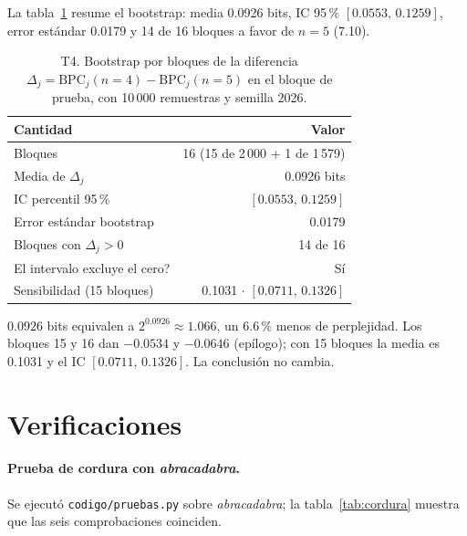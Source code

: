 \documentclass[11pt,letterpaper]{article}
\newcommand{\BPC}{\text{BPC}}
\begin{document}
La tabla~\ref{tab:T4} resume el bootstrap: media 0.0926 bits, IC 95\,\% $[0.0553,\,0.1259]$, error estándar 0.0179 y 14 de 16 bloques a favor de $n=5$ (7.10).

\begin{table}[htbp]
\centering
\small
\caption{T4. Bootstrap por bloques de la diferencia $\Delta_j=\BPC_j(n=4)-\BPC_j(n=5)$ en el bloque de prueba, con 10\,000 remuestras y semilla 2026.}
\label{tab:T4}
\begin{tabular}{@{}lr@{}}
\toprule
\textbf{Cantidad} & \textbf{Valor}\\
\midrule
Bloques & 16 (15 de 2\,000 + 1 de 1\,579)\\
Media de $\Delta_j$ & 0.0926 bits\\
IC percentil 95\,\% & $[0.0553,\,0.1259]$\\
Error estándar bootstrap & 0.0179\\
Bloques con $\Delta_j>0$ & 14 de 16\\
\textquestiondown{}El intervalo excluye el cero? & Sí\\
Sensibilidad (15 bloques) & 0.1031 $\cdot$ $[0.0711,\,0.1326]$\\
\bottomrule
\end{tabular}
\end{table}

$0.0926$ bits equivalen a $2^{0.0926}\approx1.066$, un 6.6\,\% menos de perplejidad. Los bloques 15 y 16 dan $-0.0534$ y $-0.0646$ (epílogo); con 15 bloques la media es 0.1031 y el IC $[0.0711,\,0.1326]$. La conclusión no cambia.

\section{Verificaciones}\label{sec:verificaciones}

\paragraph{Prueba de cordura con \emph{abracadabra}.}

Se ejecutó \texttt{codigo/pruebas.py} sobre \emph{abracadabra}; la tabla~\ref{tab:cordura} muestra que las seis comprobaciones coinciden.
\end{document}

